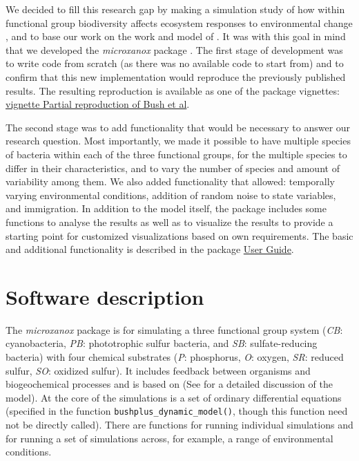 \documentclass[]{elsarticle} %
\begin{document}
We decided to fill this research gap by making a simulation study of how
within functional group biodiversity affects ecosystem responses to
environmental change \citet{Limberger2022}, and to base our work on the
work and model of \citet{Bush2017}. It was with this goal in mind that
we developed the \emph{microxanox} package \citep{Krug2022}. The first
stage of development was to write code from scratch (as there was no
available code to start from) and to confirm that this new
implementation would reproduce the previously published results. The
resulting reproduction is available as one of the package vignettes:
\href{https://uzh-peg.r-universe.dev/articles/microxanox/partial-reproduction-Bushetal2017.html}{vignette
Partial reproduction of Bush et al}.

The second stage was to add functionality that would be necessary to
answer our research question. Most importantly, we made it possible to
have multiple species of bacteria within each of the three functional
groups, for the multiple species to differ in their characteristics, and
to vary the number of species and amount of variability among them. We
also added functionality that allowed: temporally varying environmental
conditions, addition of random noise to state variables, and
immigration. In addition to the model itself, the package includes some
functions to analyse the results as well as to visualize the results to
provide a starting point for customized visualizations based on own
requirements. The basic and additional functionality is described in the
package
\href{https://uzh-peg.r-universe.dev/articles/microxanox/User-guide.html}{User
Guide}.

\hypertarget{software-description}{%
\section{Software description}\label{software-description}}

The \emph{microxanox} package is for simulating a three functional group
system (\emph{CB}: cyanobacteria, \emph{PB}: phototrophic sulfur
bacteria, and \emph{SB}: sulfate-reducing bacteria) with four chemical
substrates (\emph{P}: phosphorus, \emph{O}: oxygen, \emph{SR}: reduced
sulfur, \emph{SO}: oxidized sulfur). It includes feedback between
organisms and biogeochemical processes and is based on \citet{Bush2017}
(See \citet{Bush2017} for a detailed discussion of the model). At the
core of the simulations is a set of ordinary differential equations
(specified in the function \texttt{bushplus\_dynamic\_model()}, though
this function need not be directly called). There are functions for
running individual simulations and for running a set of simulations
across, for example, a range of environmental conditions.
\end{document}
